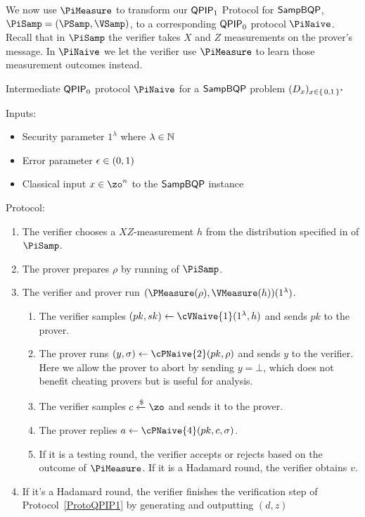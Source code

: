 We now use $\PiMeasure$ to transform our $\operatorname{\mathsf{QPIP}}_1$ Protocol for $\operatorname{\mathsf{SampBQP}}$, $\PiSamp=(\PSamp, \VSamp)$, to a corresponding $\operatorname{\mathsf{QPIP}}_0$ protocol $\PiNaive$.
Recall that in $\PiSamp$ the verifier takes $X$ and $Z$ measurements on the prover's message.
In $\PiNaive$ we let the verifier use $\PiMeasure$ to learn those measurement outcomes instead.

\begin{protocol}{Intermediate $\operatorname{\mathsf{QPIP}}_0$ protocol $\PiNaive$ for a $\operatorname{\mathsf{SampBQP}}$ problem $(D_x)_{x\in\set{0, 1}^*}$}
	\label{proto:qpip0_naive}

	Inputs:
	\begin{itemize}
		\item Security parameter $1^\lambda$ where $\lambda\in\mathbb{N}$
		\item Error parameter $\epsilon\in(0, 1)$
		\item Classical input $x\in\zo^n$ to the $\operatorname{\mathsf{SampBQP}}$ instance
	\end{itemize}

	Protocol:
	\begin{enumerate}
		\item \label{step:naive1} The verifier chooses a $XZ$-measurement $h$ from the distribution specified in  of $\PiSamp$.
		\item \label{step:naive2} The prover prepares $\rho$ by running  of $\PiSamp$.
		\item \label{step:urmila-in-naive}
			The verifier and prover run $(\PMeasure(\rho), \VMeasure(h))(1^\lambda)$.
			\begin{enumerate}
				\item The verifier samples $(pk, sk)\leftarrow\cVNaive{1}(1^\lambda, h)$ and sends $pk$ to the prover.
				\item The prover runs $(y, \sigma)\leftarrow\cPNaive{2}(pk, \rho)$ and sends $y$ to the verifier.
					Here we allow the prover to abort by sending $y=\bot$, which does not benefit cheating provers but is useful for analysis.
				\item\label{step:c-urmila-in-naive} The verifier samples $c\xleftarrow{\$}\zo$ and sends it to the prover.
				\item The prover replies $a\leftarrow\cPNaive{4}(pk, c, \sigma)$.
				\item
					If it is a testing round, the verifier accepts or rejects based on the outcome of $\PiMeasure$.
					If it is a Hadamard round, the verifier obtains $v$.
			\end{enumerate}
		\item \label{step:naive-output} If it's a Hadamard round, the verifier finishes the verification step of Protocol~\ref{ProtoQPIP1} by generating and outputting $(d, z)$
	\end{enumerate}
\end{protocol}


